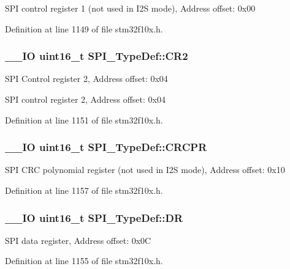 S\-P\-I control register 1 (not used in I2\-S mode), Address offset\-: 0x00 

Definition at line 1149 of file stm32f10x.\-h.

\hypertarget{struct_s_p_i___type_def_ac891e34644b8dc27bacc906cfd18b235}{
\subsubsection[{C\-R2}]{\setlength{\rightskip}{0pt plus 5cm}\-\_\-\-\_\-\-I\-O {\bf uint16\-\_\-t} S\-P\-I\-\_\-\-Type\-Def\-::\-C\-R2}}\label{struct_s_p_i___type_def_ac891e34644b8dc27bacc906cfd18b235}
S\-P\-I Control register 2, Address offset\-: 0x04

S\-P\-I control register 2, Address offset\-: 0x04 

Definition at line 1151 of file stm32f10x.\-h.

\hypertarget{struct_s_p_i___type_def_a353c64e49ec9ae93b950668941f41175}{
\subsubsection[{C\-R\-C\-P\-R}]{\setlength{\rightskip}{0pt plus 5cm}\-\_\-\-\_\-\-I\-O {\bf uint16\-\_\-t} S\-P\-I\-\_\-\-Type\-Def\-::\-C\-R\-C\-P\-R}}\label{struct_s_p_i___type_def_a353c64e49ec9ae93b950668941f41175}
S\-P\-I C\-R\-C polynomial register (not used in I2\-S mode), Address offset\-: 0x10 

Definition at line 1157 of file stm32f10x.\-h.

\hypertarget{struct_s_p_i___type_def_ae192c943732b6ab5e5611e860cc05544}{
\subsubsection[{D\-R}]{\setlength{\rightskip}{0pt plus 5cm}\-\_\-\-\_\-\-I\-O {\bf uint16\-\_\-t} S\-P\-I\-\_\-\-Type\-Def\-::\-D\-R}}\label{struct_s_p_i___type_def_ae192c943732b6ab5e5611e860cc05544}
S\-P\-I data register, Address offset\-: 0x0\-C 

Definition at line 1155 of file stm32f10x.\-h.


